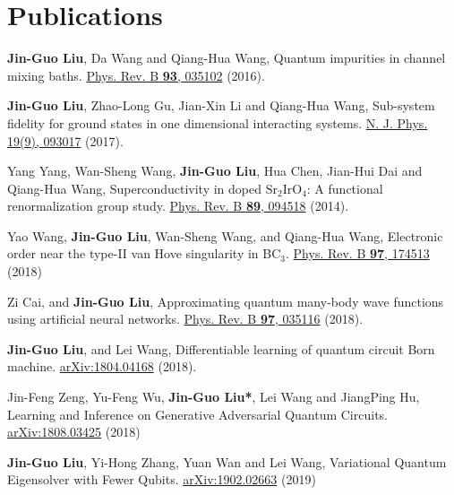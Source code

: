 \documentclass[letterpaper]{article}
\renewenvironment{itemize}{
  \begin{list}{}{
    \setlength{\leftmargin}{1.5em}
  }
}{
  \end{list}
}
\begin{document}
\section*{Publications}
\begin{itemize}
    \item [1] {\bf Jin-Guo Liu}, Da Wang and Qiang-Hua Wang, Quantum impurities in channel mixing baths. \href{https://journals.aps.org/prb/abstract/10.1103/PhysRevB.93.035102}{Phys. Rev. B {\bf 93}, 035102} (2016).
    \item [2] {\bf Jin-Guo Liu}, Zhao-Long Gu, Jian-Xin Li and Qiang-Hua Wang, Sub-system fidelity for ground states in one dimensional interacting systems. \href{http://iopscience.iop.org/article/10.1088/1367-2630/aa6a4b}{N. J. Phys. 19(9), 093017} (2017).
    \item [3] Yang Yang, Wan-Sheng Wang, {\bf Jin-Guo Liu}, Hua Chen, Jian-Hui Dai and Qiang-Hua Wang, Superconductivity in doped ${\mathrm{Sr}}_{2}{\mathrm{IrO}}_{4}$: A functional renormalization group study. \href{https://journals.aps.org/prb/abstract/10.1103/PhysRevB.89.094518}{Phys. Rev. B {\bf 89}, 094518} (2014).
    \item [4] Yao Wang, {\bf Jin-Guo Liu}, Wan-Sheng Wang, and Qiang-Hua Wang, Electronic order near the type-II van Hove singularity in BC${}_3$. \href{https://journals.aps.org/prb/abstract/10.1103/PhysRevB.97.174513}{Phys. Rev. B {\bf 97}, 174513} (2018)
    \item [5] Zi Cai, and {\bf Jin-Guo Liu}, Approximating quantum many-body wave functions using artificial neural networks. \href{https://journals.aps.org/prb/abstract/10.1103/PhysRevB.97.035116}{Phys. Rev. B {\bf 97}, 035116} (2018).
    \item [6] {\bf Jin-Guo Liu}, and Lei Wang, Differentiable learning of quantum circuit Born machine. \href{https://arxiv.org/abs/1804.04168}{arXiv:1804.04168} (2018).
    \item [7] Jin-Feng Zeng, Yu-Feng Wu, {\bf Jin-Guo Liu*}, Lei Wang and JiangPing Hu, Learning and Inference on Generative Adversarial Quantum Circuits. \href{https://arxiv.org/abs/1808.03425}{arXiv:1808.03425} (2018)
    \item [8] {\bf Jin-Guo Liu}, Yi-Hong Zhang, Yuan Wan and Lei Wang, Variational Quantum Eigensolver with Fewer Qubits. \href{https://arxiv.org/abs/1902.02663}{arXiv:1902.02663} (2019)
\end{itemize}
\end{document}
